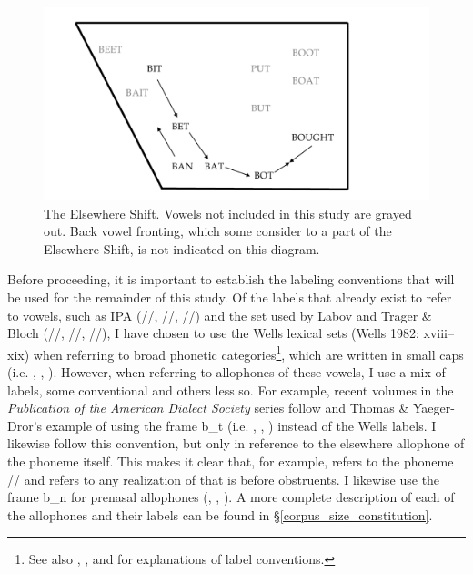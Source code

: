 \begin{figure}[tb!]
    \centering
    \includegraphics[width = 6.5in]{Figures/other_figures/cvs_diagram.pdf}
    \caption[The Elsewhere Shift]{The Elsewhere Shift. Vowels not included in this study are grayed out. Back vowel fronting, which some consider to a part of the Elsewhere Shift, is not indicated on this diagram.}
    \label{fig:elsewhere_shift_diagram}
\end{figure}

Before proceeding, it is important to establish the labeling conventions that will be used for the remainder of this study. Of the labels that already exist to refer to vowels, such as IPA (/\textipa{\ae}/, //, //) and the set used by Labov and Trager \& Bloch (/\textipa{\ae}/, //, //), I have chosen to use the Wells lexical sets (Wells 1982: xviii–xix) when referring to broad phonetic categories\footnote{See also \citealt[43]{kennedy_grama_2012}, \citealt{fruehwald_2018}, and \citealt{stanley_2019_blog} for explanations of label conventions.}, which are written in {\sc small caps} (i.e. \trap, \dress, \kit). However, when referring to allophones of these vowels, I use a mix of labels, some conventional and others less so. For example, recent volumes in the \textit{Publication of the American Dialect Society} series follow \citet{eckert_2008} and Thomas \& Yaeger-Dror's \citeyearpar{thomas_yaegerdror_2009} example of using the frame {\sc b\_t} (i.e. \bat, \bet, \bit) instead of the Wells labels. I likewise follow this convention, but only in reference to the elsewhere allophone of the phoneme itself. This makes it clear that, for example, \kit refers to the phoneme // and \bit refers to any realization of \kit that is before obstruents. I likewise use the frame {\sc b\_n} for prenasal allophones (\ban, \ben, \bin). A more complete description of each of the allophones and their labels can be found in \S\ref{corpus_size_constitution}.





